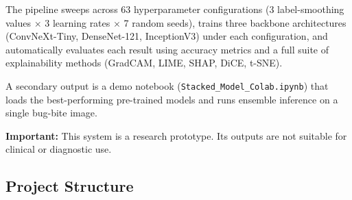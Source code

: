 \documentclass[12pt,a4paper]{article}
\begin{document}
The pipeline sweeps across 63 hyperparameter configurations (3
label-smoothing values $\times$ 3 learning rates $\times$ 7 random seeds),
trains three backbone architectures (ConvNeXt-Tiny, DenseNet-121,
InceptionV3) under each configuration, and automatically evaluates each
result using accuracy metrics and a full suite of explainability methods
(GradCAM, LIME, SHAP, DiCE, t-SNE).

A secondary output is a demo notebook (\texttt{Stacked\_Model\_Colab.ipynb})
that loads the best-performing pre-trained models and runs ensemble
inference on a single bug-bite image.

\textbf{Important:} This system is a research prototype. Its outputs are
not suitable for clinical or diagnostic use.

\subsection{Project Structure}
\label{sec:ug-structure}
\end{document}
